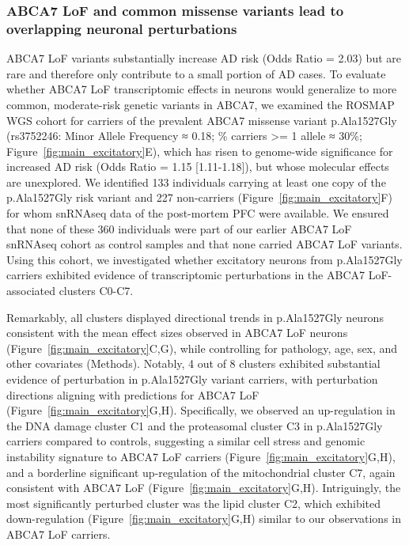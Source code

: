 \subsubsection{ABCA7 LoF and common missense variants lead to overlapping neuronal perturbations}
ABCA7 LoF variants substantially increase AD risk (Odds Ratio = 2.03)\cite{Steinberg2015-mu} but are rare and therefore only contribute to a small portion of AD cases\cite{Duchateau2024-rf}. To evaluate whether ABCA7 LoF transcriptomic effects in neurons would generalize to more common, moderate-risk genetic variants in ABCA7, we examined the ROSMAP WGS cohort for carriers of the prevalent ABCA7 missense variant p.Ala1527Gly (rs3752246: Minor Allele Frequency ≈ 0.18; \% carriers >= 1 allele  ≈  30\%; Figure~\ref{fig:main_excitatory}E), which has risen to genome-wide significance for increased AD risk (Odds Ratio = 1.15 [1.11-1.18])\cite{Kunkle2019-yo,Holstege2022-vp,Naj2011-bs}, but whose molecular effects are unexplored. We identified 133 individuals carrying at least one copy of the p.Ala1527Gly risk variant and 227 non-carriers (Figure~\ref{fig:main_excitatory}F) for whom snRNAseq data of the post-mortem PFC were available\cite{Mathys2023-rs}. We ensured that none of these 360 individuals were part of our earlier ABCA7 LoF snRNAseq cohort as control samples and that none carried ABCA7 LoF variants. Using this cohort, we investigated whether excitatory neurons from p.Ala1527Gly carriers exhibited evidence of transcriptomic perturbations in the ABCA7 LoF-associated clusters C0-C7.

Remarkably, all clusters displayed directional trends in p.Ala1527Gly neurons consistent with the mean effect sizes observed in ABCA7 LoF neurons (Figure~\ref{fig:main_excitatory}C,G), while controlling for pathology, age, sex, and other covariates (Methods). Notably, 4 out of 8 clusters exhibited substantial evidence of perturbation in p.Ala1527Gly variant carriers, with perturbation directions aligning with predictions for ABCA7 LoF (Figure~\ref{fig:main_excitatory}G,H). Specifically, we observed an up-regulation in the DNA damage cluster C1 and the proteasomal cluster C3 in p.Ala1527Gly carriers compared to controls, suggesting a similar cell stress and genomic instability signature to ABCA7 LoF carriers (Figure~\ref{fig:main_excitatory}G,H), and a borderline significant up-regulation of the mitochondrial cluster C7, again consistent with ABCA7 LoF (Figure~\ref{fig:main_excitatory}G,H). Intriguingly, the most significantly perturbed cluster was the lipid cluster C2, which exhibited down-regulation (Figure~\ref{fig:main_excitatory}G,H) similar to our observations in ABCA7 LoF carriers. 

